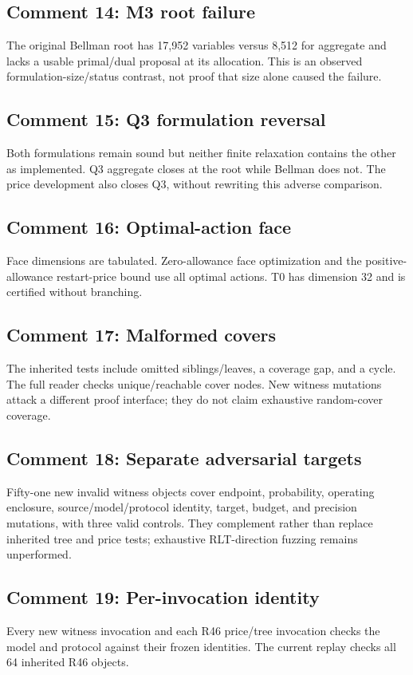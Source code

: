 \subsection{Comment 14: M3 root failure}
The original Bellman root has 17,952 variables versus 8,512 for aggregate and lacks a usable primal/dual proposal at its allocation. This is an observed formulation-size/status contrast, not proof that size alone caused the failure.

\subsection{Comment 15: Q3 formulation reversal}
Both formulations remain sound but neither finite relaxation contains the other as implemented. Q3 aggregate closes at the root while Bellman does not. The price development also closes Q3, without rewriting this adverse comparison.

\subsection{Comment 16: Optimal-action face}
Face dimensions are tabulated. Zero-allowance face optimization and the positive-allowance restart-price bound use all optimal actions. T0 has dimension 32 and is certified without branching.

\subsection{Comment 17: Malformed covers}
The inherited tests include omitted siblings/leaves, a coverage gap, and a cycle. The full reader checks unique/reachable cover nodes. New witness mutations attack a different proof interface; they do not claim exhaustive random-cover coverage.

\subsection{Comment 18: Separate adversarial targets}
Fifty-one new invalid witness objects cover endpoint, probability, operating enclosure, source/model/protocol identity, target, budget, and precision mutations, with three valid controls. They complement rather than replace inherited tree and price tests; exhaustive RLT-direction fuzzing remains unperformed.

\subsection{Comment 19: Per-invocation identity}
Every new witness invocation and each R46 price/tree invocation checks the model and protocol against their frozen identities. The current replay checks all 64 inherited R46 objects.

